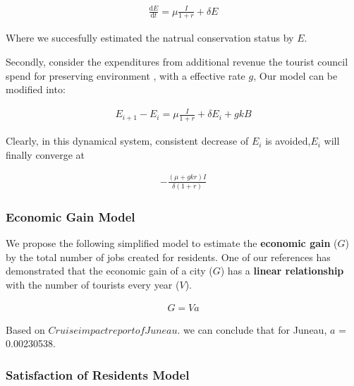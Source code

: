\documentclass[UTF8]{mcmthesis}
\begin{document}
\begin{equation}
    \begin{aligned}
\frac{\text{d}E}{\text{d}t}  =  \mu \frac{I}{1+r}+\delta E 
    \end{aligned}
    \end{equation}

    Where we succesfully estimated the natrual conservation status by ${E}$.

Secondly, consider the expenditures from additional revenue the tourist council spend for preserving environment , with a effective rate ${g}$, Our model can be modified into:

\begin{equation}
    \begin{aligned}
{E_{i+1}} -E_{i} = \mu \frac{I}{1+r} + \delta {E_{i}} +gkB
    \end{aligned}
    \end{equation}

    Clearly, in this dynamical system, consistent decrease of {$E_i$} is avoided,{$E_i$}
   will finally converge at 

   \begin{align*}
    -\frac{(\mu  + gkr)I}{\delta(1+r)}
            \end{align*}


            \subsubsection{Economic Gain Model}

            \hspace*{2em} We propose the following simplified model to estimate the \textbf{economic gain} (\(G\)) by the total number of jobs created for residents. One of our references \cite{Xu} has demonstrated that the economic gain of a city (\(G\)) has a \textbf{linear relationship} with the number of tourists every year (\(V\)).
            

    \begin{equation}
        \begin{aligned}
        G = Va
        \end{aligned}
        \end{equation}

        Based on ${Cruise impact report of Juneau}$. we can conclude that for Juneau, $a$ = 0.00230538.


        \subsubsection{Satisfaction of Residents Model}
\end{document}
